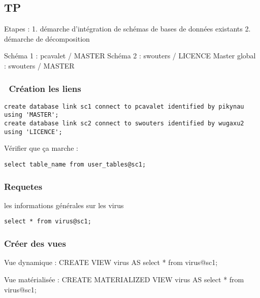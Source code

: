 \subsection{TP}\label{tp}

Etapes : 1. démarche d'intégration de schémas de bases de données
existants 2. démarche de décomposition

Schéma 1 : pcavalet / MASTER Schéma 2 : swouters / LICENCE Master global
: swouters / MASTER

\subsubsection{~Création les liens}\label{cruxe9ation-les-liens}

\begin{verbatim}
create database link sc1 connect to pcavalet identified by pikynau using 'MASTER';
create database link sc2 connect to swouters identified by wugaxu2 using 'LICENCE';
\end{verbatim}

Vérifier que ça marche :

\begin{verbatim}
select table_name from user_tables@sc1;
\end{verbatim}

\subsubsection{Requetes}\label{requetes}

les informations générales sur les virus

\begin{verbatim}
select * from virus@sc1;
\end{verbatim}

\subsubsection{Créer des vues}\label{cruxe9er-des-vues}

Vue dynamique : CREATE VIEW virus AS select * from virus@sc1;

Vue matérialisée : CREATE MATERIALIZED VIEW virus AS select * from
virus@sc1;
